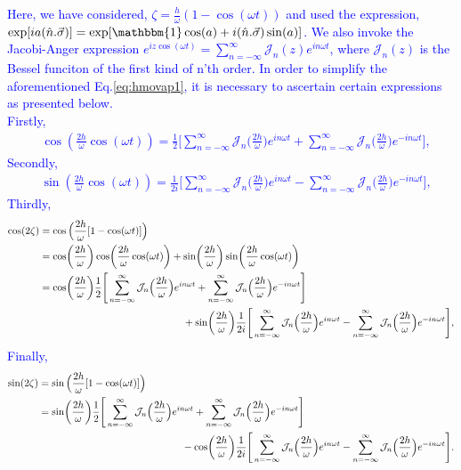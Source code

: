 \documentclass[%
reprint,
superscriptaddress,
amsmath,amssymb,showkeys,
aps,
prb,
]{revtex4-2}
\newcommand{\blue}[1]{\textcolor{blue}{#1}}
\begin{document}
\blue{
	Here, we have considered, $\zeta = \frac{h}{\omega}(1-\cos(\omega t))$ and used the expression, $\exp[ia(\hat{n}.\vec{\sigma})] = \exp[\mathbbm{1} \cos(a) + i (\hat{n}.\vec{\sigma})\sin(a)]$. We also invoke the Jacobi-Anger expression $\displaystyle e^{iz\cos(\omega t)} = \sum_{n=-\infty}^{\infty}\mathcal{J}_n(z)e^{in\omega t}$\cite{arfkenmath}, where $\mathcal{J}_n(z)$ is the Bessel funciton of the first kind of n'th order. In order to simplify the aforementioned Eq.\eqref{eq:hmovap1}, it is necessary to ascertain certain expressions as presented below.\\
	Firstly,
	\begin{align}
		&\cos(\frac{2h}{\omega}\cos(\omega t)) = \frac12\Bigg[\sum_{n=-\infty}^{\infty} \mathcal{J}_n\Big(\frac{2h}{\omega}\Big)e^{in\omega t} + \sum_{n=-\infty}^{\infty} \mathcal{J}_n\Big(\frac{2h}{\omega}\Big)e^{-in\omega t}\Bigg],
	\end{align}
	Secondly,
	\begin{align}
		&\sin(\frac{2h}{\omega}\cos(\omega t)) = \frac{1}{2i}\Bigg[\sum_{n=-\infty}^{\infty} \mathcal{J}_n\Big(\frac{2h}{\omega}\Big)e^{in\omega t} - \sum_{n=-\infty}^{\infty} \mathcal{J}_n\Big(\frac{2h}{\omega}\Big)e^{-in\omega t}\Bigg],
	\end{align}
	Thirdly,
	\begin{align}
	\cos(2\zeta) &= \cos\Big(\frac{2h}{\omega}[1-\cos(\omega t)]\Big)\nonumber\\
	&=  \cos(\frac{2h}{\omega})\cos(\frac{2h}{\omega} \cos(\omega t)) + \sin(\frac{2h}{\omega})\sin(\frac{2h}{\omega} \cos(\omega t))\nonumber\\
	&=  \cos(\frac{2h}{\omega})\frac12\Bigg[\sum_{n=-\infty}^{\infty} \mathcal{J}_n\Big(\frac{2h}{\omega}\Big)e^{in\omega t} + \sum_{n=-\infty}^{\infty} \mathcal{J}_n\Big(\frac{2h}{\omega}\Big)e^{-in\omega t}\Bigg] \nonumber\\ & \hskip 5cm + \sin(\frac{2h}{\omega})\frac{1}{2i}\Bigg[\sum_{n=-\infty}^{\infty} \mathcal{J}_n\Big(\frac{2h}{\omega}\Big)e^{in\omega t} - \sum_{n=-\infty}^{\infty} \mathcal{J}_n\Big(\frac{2h}{\omega}\Big)e^{-in\omega t}\Bigg],
	\label{eq:hmovap2}
	\end{align}
	Finally,
	\begin{align}
		\sin(2\zeta) &= \sin\Big(\frac{2h}{\omega}[1-\cos(\omega t)]\Big)\nonumber\\
		&=  \sin(\frac{2h}{\omega})\frac12\Bigg[\sum_{n=-\infty}^{\infty} \mathcal{J}_n\Big(\frac{2h}{\omega}\Big)e^{in\omega t} + \sum_{n=-\infty}^{\infty} \mathcal{J}_n\Big(\frac{2h}{\omega}\Big)e^{-in\omega t}\Bigg] \nonumber\\ & \hskip 5cm - \cos(\frac{2h}{\omega})\frac{1}{2i}\Bigg[\sum_{n=-\infty}^{\infty} \mathcal{J}_n\Big(\frac{2h}{\omega}\Big)e^{in\omega t} - \sum_{n=-\infty}^{\infty} \mathcal{J}_n\Big(\frac{2h}{\omega}\Big)e^{-in\omega t}\Bigg].

\end{align}}
\end{document}
